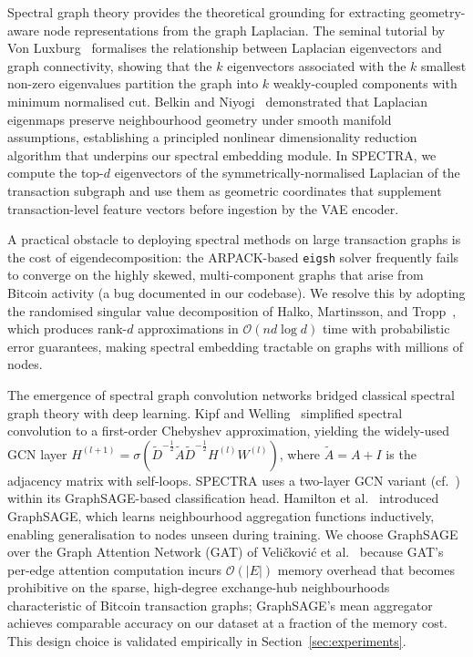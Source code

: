 \documentclass[journal]{IEEEtran}
\begin{document}
Spectral graph theory provides the theoretical grounding for extracting
geometry-aware node representations from the graph Laplacian.  The seminal
tutorial by Von Luxburg~\cite{VonLuxburg2007} formalises the relationship
between Laplacian eigenvectors and graph connectivity, showing that the $k$
eigenvectors associated with the $k$ smallest non-zero eigenvalues partition the
graph into $k$ weakly-coupled components with minimum normalised cut.  Belkin
and Niyogi~\cite{Belkin2003} demonstrated that Laplacian eigenmaps preserve
neighbourhood geometry under smooth manifold assumptions, establishing a
principled nonlinear dimensionality reduction algorithm that underpins our
spectral embedding module.  In SPECTRA, we compute the top-$d$ eigenvectors of
the symmetrically-normalised Laplacian of the transaction subgraph and use them
as geometric coordinates that supplement transaction-level feature vectors
before ingestion by the VAE encoder.

A practical obstacle to deploying spectral methods on large transaction graphs
is the cost of eigendecomposition: the ARPACK-based \texttt{eigsh} solver
frequently fails to converge on the highly skewed, multi-component graphs that
arise from Bitcoin activity (a bug documented in our codebase).  We resolve this
by adopting the randomised singular value decomposition of Halko, Martinsson,
and Tropp~\cite{Halko2011}, which produces rank-$d$ approximations in
$\mathcal{O}(n d \log d)$ time with probabilistic error guarantees, making
spectral embedding tractable on graphs with millions of nodes.

The emergence of spectral graph convolution networks bridged classical spectral
graph theory with deep learning.  Kipf and Welling~\cite{Kipf2017} simplified
spectral convolution to a first-order Chebyshev approximation, yielding the
widely-used GCN layer $H^{(l+1)} = \sigma\!\left(\tilde{D}^{-\frac{1}{2}}
\tilde{A}\tilde{D}^{-\frac{1}{2}} H^{(l)} W^{(l)}\right)$, where
$\tilde{A} = A + I$ is the adjacency matrix with self-loops.  SPECTRA uses a
two-layer GCN variant (cf.~\cite{Kipf2016b}) within its GraphSAGE-based
classification head.  Hamilton et al.~\cite{Hamilton2017} introduced
GraphSAGE, which learns neighbourhood aggregation functions inductively,
enabling generalisation to nodes unseen during training.  We choose GraphSAGE
over the Graph Attention Network (GAT) of Veli\v{c}kovi\'{c} et
al.~\cite{Velickovic2018} because GAT's per-edge attention computation incurs
$\mathcal{O}(|E|)$ memory overhead that becomes prohibitive on the sparse,
high-degree exchange-hub neighbourhoods characteristic of Bitcoin transaction
graphs; GraphSAGE's mean aggregator achieves comparable accuracy on our dataset
at a fraction of the memory cost.  This design choice is validated empirically
in Section~\ref{sec:experiments}.
\end{document}

